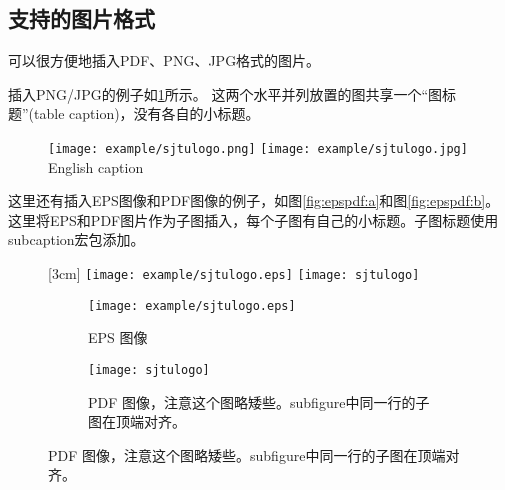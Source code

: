 \subsection{支持的图片格式}
\label{sec:imageformat}

\XeTeX 可以很方便地插入PDF、PNG、JPG格式的图片。

插入PNG/JPG的例子如\ref{fig:SRR}所示。
这两个水平并列放置的图共享一个“图标题”(table caption)，没有各自的小标题。

\begin{figure}[!htp]
  \centering
  \texttt{[image: example/sjtulogo.png]}
  \hspace{1cm}
  \texttt{[image: example/sjtulogo.jpg]}
    {English caption}
  \label{fig:SRR}
\end{figure}

这里还有插入EPS图像和PDF图像的例子，如图\ref{fig:epspdf:a}和图\ref{fig:epspdf:b}。这里将EPS和PDF图片作为子图插入，每个子图有自己的小标题。子图标题使用subcaption宏包添加。

\begin{figure}[!htp]
  \centering
  [3cm] %
    {\texttt{[image: example/sjtulogo.eps]}}
  \hspace{4em}
    {\texttt{[image: sjtulogo]}}
  \label{fig:pdfeps-subcaptionbox}
\end{figure}

\begin{figure}[!htp]
  \centering
  \begin{subfigure}{2.5cm}
    \centering
    \texttt{[image: example/sjtulogo.eps]}
    \caption{EPS 图像}
  \end{subfigure}
  \hspace{4em}
  \begin{subfigure}{0.4\textwidth}
    \centering
    \texttt{[image: sjtulogo]}
    \caption{PDF 图像，注意这个图略矮些。subfigure中同一行的子图在顶端对齐。}
  \end{subfigure}
  \label{fig:pdfeps-subfigure}
\end{figure}

